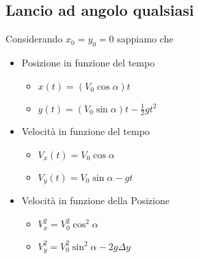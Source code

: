 \documentclass[../main.tex]{subfiles}
\begin{document}
\subsection{Lancio ad angolo qualsiasi}
Considerando $x_0 = y_0 = 0$ sappiamo che
\begin{itemize}
    \item Posizione in funzione del tempo
    \begin{itemize}
        \item $x(t) = (V_{0}\cos \alpha) t$
        \item $y(t) = (V_0\sin\alpha)t - \frac{1}{2}gt^2$
    \end{itemize}
    \item Velocità in funzione del tempo
    \begin{itemize}
        \item $V_x(t) = V_{0}\cos\alpha$
        \item $V_y(t) = V_0\sin\alpha- gt$
    \end{itemize}
    \item Velocità in funzione della Posizione
    \begin{itemize}
        \item $V_x^2 = V_{0}^2 \cos^2\alpha$
        \item $V_y^2 =V_0^2\sin^2\alpha - 2g\Delta y$
    \end{itemize}
\end{itemize}
\end{document}
